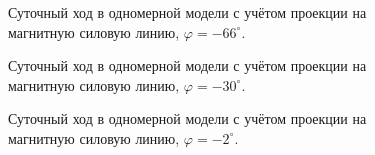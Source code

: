 \documentclass[14pt, a4paper, fleqn]{extarticle}
\begin{document}
\begin{figure}[H]
\caption{Суточный ход в одномерной модели с учётом проекции на магнитную силовую линию, $\varphi = -66^\circ$.}
\end{figure}

\begin{figure}[H]
\caption{Суточный ход в одномерной модели с учётом проекции на магнитную силовую линию, $\varphi = -30^\circ$.}
\end{figure}

\begin{figure}[H]
\caption{Суточный ход в одномерной модели с учётом проекции на магнитную силовую линию, $\varphi = -2^\circ$.}
\end{figure}
\end{document}
